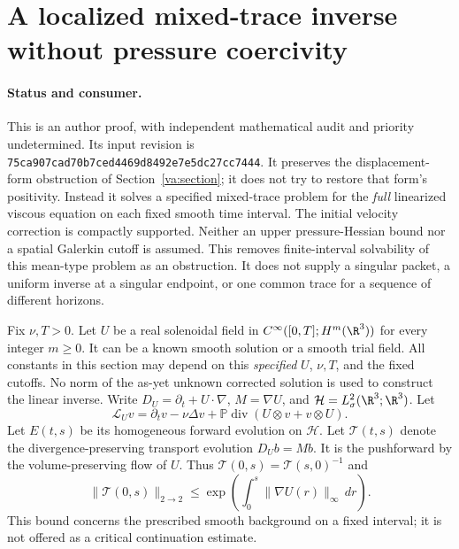 \section{A localized mixed-trace inverse without pressure coercivity}
\label{vf:section}

\paragraph{Status and consumer.}
This is an author proof, with independent mathematical audit and priority
undetermined. Its input revision is
\texttt{75ca907cad70b7ced4469d8492e7e5dc27cc7444}.
It preserves the displacement-form obstruction of
Section~\ref{va:section}; it does not try to restore that form's positivity.
Instead it solves a specified mixed-trace problem for the \emph{full}
linearized viscous equation on each fixed smooth time interval. The
initial velocity correction is compactly supported. Neither an upper
pressure-Hessian bound nor a spatial Galerkin cutoff is assumed.
This removes finite-interval solvability of this mean-type problem as an
obstruction. It does not supply a singular packet, a uniform inverse at a
singular endpoint, or one common trace for a sequence of different horizons.

Fix $\nu,T>0$. Let $U$ be a real solenoidal field in
$C^\infty([0,T];H^m(\R^3))$ for every integer $m\ge0$.
It can be a known smooth solution or a smooth trial field.
All constants in this section may depend on this \emph{specified} $U$,
$\nu,T$, and the fixed cutoffs. No norm of the as-yet unknown corrected
solution is used to construct the linear inverse.
Write $D_U=\partial_t+U\cdot\nabla$, $M=\nabla U$, and
$\mathcal H=L^2_\sigma(\R^3;\R^3)$. Let
\[
 \mathcal L_U v=\partial_tv-\nu\Delta v+
       \mathbb P\operatorname{div}(U\otimes v+v\otimes U).
\]
Let $E(t,s)$ be its homogeneous forward evolution on $\mathcal H$.
Let $\mathcal T(t,s)$ denote the divergence-preserving transport evolution
$D_U b=M b$. It is the pushforward by the volume-preserving flow of $U$.
Thus $\mathcal T(0,s)=\mathcal T(s,0)^{-1}$ and
\[
 \|\mathcal T(0,s)\|_{2\to2}
 \le \exp\left(\int_0^s\|\nabla U(r)\|_\infty\,dr\right).
\]
This bound concerns the prescribed smooth background on a fixed interval;
it is not offered as a critical continuation estimate.

